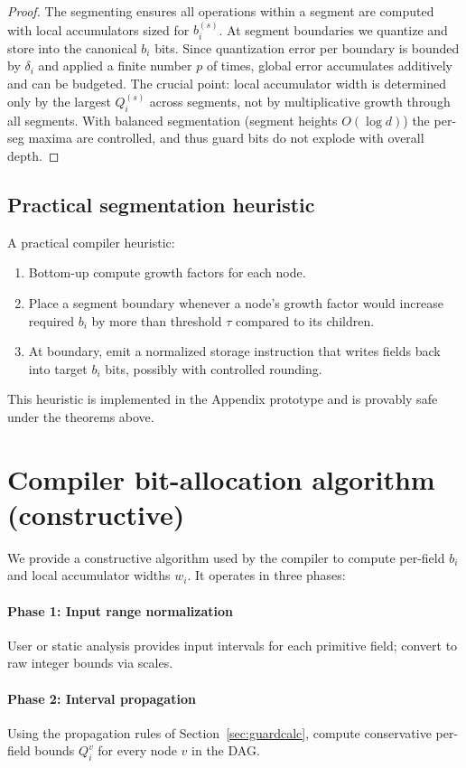 \documentclass[11pt]{article}
\theoremstyle{definition}
\theoremstyle{plain}
\begin{document}
\begin{proof}
The segmenting ensures all operations within a segment are computed with local accumulators sized for \(b_i^{(s)}\). At segment boundaries we quantize and store into the canonical \(b_i\) bits. Since quantization error per boundary is bounded by \(\delta_i\) and applied a finite number \(p\) of times, global error accumulates additively and can be budgeted. The crucial point: local accumulator width is determined only by the largest \(Q_i^{(s)}\) across segments, not by multiplicative growth through all segments. With balanced segmentation (segment heights \(O(\log d)\)) the per-seg maxima are controlled, and thus guard bits do not explode with overall depth.
\end{proof}

\subsection{Practical segmentation heuristic}
A practical compiler heuristic:
\begin{enumerate}
  \item Bottom-up compute growth factors for each node.
  \item Place a segment boundary whenever a node's growth factor would increase required \(b_i\) by more than threshold \(\tau\) compared to its children.
  \item At boundary, emit a normalized storage instruction that writes fields back into target \(b_i\) bits, possibly with controlled rounding.
\end{enumerate}
This heuristic is implemented in the Appendix prototype and is provably safe under the theorems above.

\section{Compiler bit-allocation algorithm (constructive)}
\label{sec:compiler}
We provide a constructive algorithm used by the compiler to compute per-field \(b_i\) and local accumulator widths \(w_i\). It operates in three phases:

\paragraph{Phase 1: Input range normalization} User or static analysis provides input intervals for each primitive field; convert to raw integer bounds via scales.

\paragraph{Phase 2: Interval propagation} Using the propagation rules of Section~\ref{sec:guardcalc}, compute conservative per-field bounds \(Q_i^{v}\) for every node \(v\) in the DAG.
\end{document}
